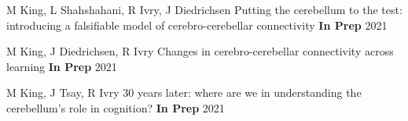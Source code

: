 

\begin{cventries}

  \cventry
    {M King, L Shahshahani, R Ivry, J Diedrichsen} %
    {Putting the cerebellum to the test: introducing a falsifiable model of cerebro-cerebellar connectivity} %
    {\textbf{In Prep}} %
    {2021} %
    {}
    
  \cventry
    {M King, J Diedrichsen, R Ivry} %
    {Changes in cerebro-cerebellar connectivity across learning} %
    {\textbf{In Prep}} %
    {2021} %
    {}
    
  \cventry
    {M King, J Tsay, R Ivry} %
    {30 years later: where are we in understanding the cerebellum's role in cognition?} %
    {\textbf{In Prep}} %
    {2021} %
    {}


\end{cventries}



